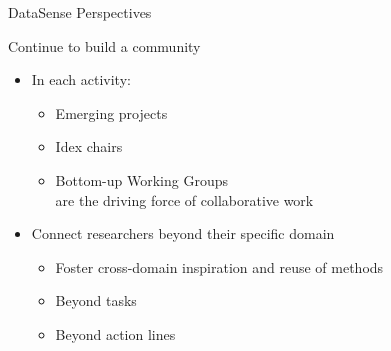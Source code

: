 \begin{frame}{DataSense Perspectives}

{Continue to build a community}
\begin{itemize}
\item In each activity:
\begin{itemize}
\item Emerging projects
\item Idex chairs
\item Bottom-up Working Groups\\
  are the driving force of collaborative work
\end{itemize}

\item 
Connect researchers beyond their specific domain

\begin{itemize}
\item Foster cross-domain inspiration and reuse of methods
\item Beyond tasks
\item Beyond action lines
\end{itemize}


\end{itemize}
\end{frame}



